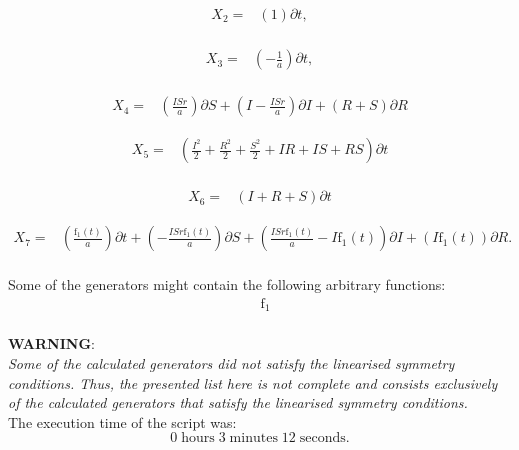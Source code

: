 \begin{align*}
X_{2}=&\left(1 \right)\partial t,\\
\end{align*}

\begin{align*}
X_{3}=&\left(- \frac{1}{a} \right)\partial t,\\
\end{align*}

\begin{align*}
X_{4}=&\left(\frac{I S r}{a} \right)\partial S+\left(I- \frac{I S r}{a} \right)\partial I+\left(R+S \right)\partial R
\end{align*}

\begin{align*}
X_{5}=&\left(\frac{I^{2}}{2}+\frac{R^{2}}{2}+\frac{S^{2}}{2}+I R+I S+R S \right)\partial t\\
\end{align*}

\begin{align*}
X_{6}=&\left(I+R+S \right)\partial t
\end{align*}

\begin{align*}
X_{7}=&\left(\frac{\operatorname{f_{1}}{\left(t \right)}}{a} \right)\partial t+\left(- \frac{I S r \operatorname{f_{1}}{\left(t \right)}}{a} \right)\partial S+\left(\frac{I S r \operatorname{f_{1}}{\left(t \right)}}{a} - I \operatorname{f_{1}}{\left(t \right)} \right)\partial I+\left(I \operatorname{f_{1}}{\left(t \right)} \right)\partial R.\\
\end{align*}



\noindent Some of the generators might contain the following arbitrary functions:
\begin{align*}
&\operatorname{f_{1}}\\
\end{align*}

\noindent\huge\textbf{WARNING}:\\
\noindent\Large\textit{Some of the calculated generators did not satisfy the linearised symmetry conditions. Thus, the presented list here is not complete and consists exclusively of the calculated generators that satisfy the linearised symmetry conditions.}\normalsize\\[2cm]
\noindent The execution time of the script was:
$$0\;\mathrm{hours}\;3\;\mathrm{minutes}\;12 \;\mathrm{seconds}.$$
